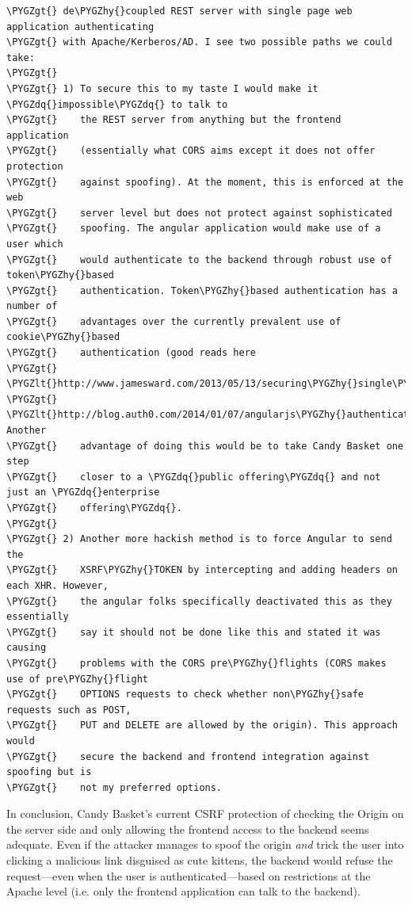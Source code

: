 \documentclass[letterpaper,10pt,english]{sphinxmanual}
\def\PYGZlt{\char`\<}
\def\PYGZgt{\char`\>}
\def\PYGZhy{\char`\-}
\def\PYGZdq{\char`\"}
\begin{document}
\begin{Verbatim}[commandchars=\\\{\}]
\PYGZgt{} de\PYGZhy{}coupled REST server with single page web application authenticating
\PYGZgt{} with Apache/Kerberos/AD. I see two possible paths we could take:
\PYGZgt{}
\PYGZgt{} 1) To secure this to my taste I would make it \PYGZdq{}impossible\PYGZdq{} to talk to
\PYGZgt{}    the REST server from anything but the frontend application
\PYGZgt{}    (essentially what CORS aims except it does not offer protection
\PYGZgt{}    against spoofing). At the moment, this is enforced at the web
\PYGZgt{}    server level but does not protect against sophisticated
\PYGZgt{}    spoofing. The angular application would make use of a user which
\PYGZgt{}    would authenticate to the backend through robust use of token\PYGZhy{}based
\PYGZgt{}    authentication. Token\PYGZhy{}based authentication has a number of
\PYGZgt{}    advantages over the currently prevalent use of cookie\PYGZhy{}based
\PYGZgt{}    authentication (good reads here
\PYGZgt{}    \PYGZlt{}http://www.jamesward.com/2013/05/13/securing\PYGZhy{}single\PYGZhy{}page\PYGZhy{}apps\PYGZhy{}and\PYGZhy{}rest\PYGZhy{}services\PYGZgt{},
\PYGZgt{}    \PYGZlt{}http://blog.auth0.com/2014/01/07/angularjs\PYGZhy{}authentication\PYGZhy{}with\PYGZhy{}cookies\PYGZhy{}vs\PYGZhy{}token/\PYGZgt{}). Another
\PYGZgt{}    advantage of doing this would be to take Candy Basket one step
\PYGZgt{}    closer to a \PYGZdq{}public offering\PYGZdq{} and not just an \PYGZdq{}enterprise
\PYGZgt{}    offering\PYGZdq{}.
\PYGZgt{}
\PYGZgt{} 2) Another more hackish method is to force Angular to send the
\PYGZgt{}    XSRF\PYGZhy{}TOKEN by intercepting and adding headers on each XHR. However,
\PYGZgt{}    the angular folks specifically deactivated this as they essentially
\PYGZgt{}    say it should not be done like this and stated it was causing
\PYGZgt{}    problems with the CORS pre\PYGZhy{}flights (CORS makes use of pre\PYGZhy{}flight
\PYGZgt{}    OPTIONS requests to check whether non\PYGZhy{}safe requests such as POST,
\PYGZgt{}    PUT and DELETE are allowed by the origin). This approach would
\PYGZgt{}    secure the backend and frontend integration against spoofing but is
\PYGZgt{}    not my preferred options.
\end{Verbatim}

In conclusion, Candy Basket's current CSRF protection of checking the
Origin on the server side and only allowing the frontend access to the
backend seems adequate. Even if the attacker manages to spoof the
origin \emph{and} trick the user into clicking a malicious link disguised as
cute kittens, the backend would refuse the request---even when the user
is authenticated---based on restrictions at the Apache level
(i.e. only the frontend application can talk to the backend).
\end{document}

